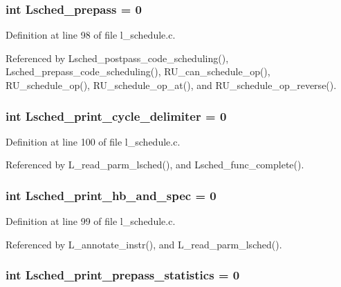 \subsubsection{\setlength{\rightskip}{0pt plus 5cm}int \bf{Lsched\_\-prepass} = 0}\label{l__schedule_8c_fac4677c213f235af5efb6e5fd7cde1b}




Definition at line 98 of file l\_\-schedule.c.

Referenced by Lsched\_\-postpass\_\-code\_\-scheduling(), Lsched\_\-prepass\_\-code\_\-scheduling(), RU\_\-can\_\-schedule\_\-op(), RU\_\-schedule\_\-op(), RU\_\-schedule\_\-op\_\-at(), and RU\_\-schedule\_\-op\_\-reverse().
\subsubsection{\setlength{\rightskip}{0pt plus 5cm}int \bf{Lsched\_\-print\_\-cycle\_\-delimiter} = 0}\label{l__schedule_8c_7689853b9040f1b843690d0c0e7de833}




Definition at line 100 of file l\_\-schedule.c.

Referenced by L\_\-read\_\-parm\_\-lsched(), and Lsched\_\-func\_\-complete().
\subsubsection{\setlength{\rightskip}{0pt plus 5cm}int \bf{Lsched\_\-print\_\-hb\_\-and\_\-spec} = 0}\label{l__schedule_8c_af219a307f8e80d27600cf40832135af}




Definition at line 99 of file l\_\-schedule.c.

Referenced by L\_\-annotate\_\-instr(), and L\_\-read\_\-parm\_\-lsched().
\subsubsection{\setlength{\rightskip}{0pt plus 5cm}int \bf{Lsched\_\-print\_\-prepass\_\-statistics} = 0}\label{l__schedule_8c_181a18821bedca4935435e87b165d3a0}




